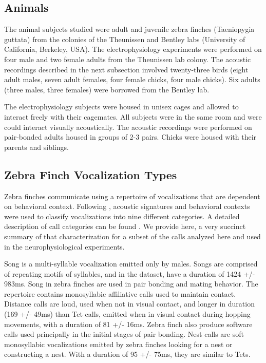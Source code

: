 \subsection{Animals}

The animal subjects studied were adult and juvenile zebra finches (Taeniopygia guttata) from the colonies of the Theunissen and Bentley labs (University of California, Berkeley, USA). The electrophysiology experiments were performed on four male and two female adults from the Theunissen lab colony. The acoustic recordings described in the next subsection involved twenty-three birds (eight adult males, seven adult females, four female chicks, four male chicks). Six adults (three males, three females) were borrowed from the Bentley lab.

The electrophysiology subjects were housed in unisex cages and allowed to interact freely with their cagemates. All subjects were in the same room and were could interact visually acoustically. The acoustic recordings were performed on pair-bonded adults housed in groups of 2-3 pairs. Chicks were housed with their parents and siblings.
    
\subsection{Zebra Finch Vocalization Types}

Zebra finches communicate using a repertoire of vocalizations that are dependent on behavioral context. Following \cite{Zann1996}, acoustic signatures and behavioral contexts were used to classify vocalizations into nine different categories. A detailed description of call categories can be found \cite{Elie2015a}. We provide here, a very succinct summary of that characterization for a subset of the calls analyzed here and used in the neurophysiological experiments.

Song is a multi-syllable vocalization emitted only by males. Songs are comprised of repeating motifs of syllables, and in the dataset, have a duration of 1424 +/- 983ms. Song in zebra finches are used in pair bonding and mating behavior. The repertoire contains monosyllabic affiliative calls used to maintain contact. Distance calls are loud, used when not in visual contact, and longer in duration (169 +/- 49ms) than Tet calls, emitted when in visual contact during hopping movements, with a duration of 81 +/- 16ms. Zebra finch also produce software calls used principally in the initial stages of pair bonding. Nest calls are soft monosyllabic vocalizations emitted by zebra finches looking for a nest or constructing a nest. With a duration of 95 +/- 75ms, they are similar to Tets.

